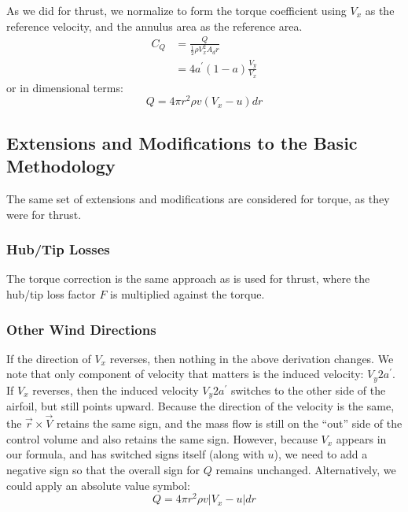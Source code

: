 \documentclass{article}
\begin{document}

As we did for thrust, we normalize to form the torque coefficient using $V_x$ as the reference velocity, and the annulus area as the reference area.
\begin{align}
    C_Q &= \frac{Q}{\frac{1}{2}\rho V_x^2 A_d r}\\
     &= 4 a^\prime (1-a) \frac{V_y}{V_x}
\end{align}
or in dimensional terms:
\begin{equation}
Q = 4 \pi r^2 \rho v (V_x - u) dr
\end{equation}

\subsection{Extensions and Modifications to the Basic Methodology}

The same set of extensions and modifications are considered for torque, as they were for thrust.

\subsubsection{Hub/Tip Losses}

The torque correction is the same approach as is used for thrust, where the hub/tip loss factor $F$ is multiplied against the torque.

\subsubsection{Other Wind Directions}

If the direction of $V_x$ reverses, then nothing in the above derivation changes.  We note that only component of velocity that matters is the induced velocity: $V_y 2 a^\prime$.  If $V_x$ reverses, then the induced velocity $V_y 2 a^\prime$ switches to the other side of the airfoil, but still points upward.  Because the direction of the velocity is the same, the $\vec{r} \times \vec{V}$ retains the same sign, and the mass flow is still on the ``out'' side of the control volume and also retains the same sign.  However, because $V_x$ appears in our formula, and has switched signs itself (along with $u$), we need to add a negative sign so that the overall sign for $Q$ remains unchanged.  Alternatively, we could apply an absolute value symbol:
\begin{equation}
Q = 4 \pi r^2 \rho v |V_x - u| dr
\end{equation}
\end{document}
